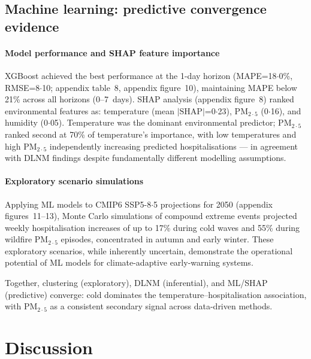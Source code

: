 \documentclass[review,number]{elsarticle}
\begin{document}
\subsection{Machine learning: predictive convergence evidence}

\paragraph{Model performance and SHAP feature importance}
XGBoost achieved the best performance at the 1-day horizon
(MAPE=18${\cdot}$0\%, RMSE=8${\cdot}$10; appendix table~8, appendix figure~10),
maintaining MAPE below 21\% across all horizons (0--7~days). SHAP
analysis (appendix figure~8) ranked environmental features as: temperature
(mean $|\text{SHAP}|$=0${\cdot}$23), $\text{PM}_{2{\cdot}5}$
(0${\cdot}$16), and humidity (0${\cdot}$05). Temperature was the
dominant environmental predictor; $\text{PM}_{2{\cdot}5}$ ranked second at
70\% of temperature's importance, with low temperatures and high
$\text{PM}_{2{\cdot}5}$ independently increasing predicted hospitalisations
--- in agreement with DLNM findings despite fundamentally different
modelling assumptions.

\paragraph{Exploratory scenario simulations}
Applying ML models to CMIP6 SSP5-8${\cdot}$5 projections for 2050
(appendix figures~11--13), Monte Carlo simulations of compound extreme events
projected weekly hospitalisation increases of up to 17\% during cold
waves and 55\% during wildfire $\text{PM}_{2{\cdot}5}$ episodes, concentrated
in autumn and early winter. These exploratory scenarios, while
inherently uncertain, demonstrate the operational potential of ML
models for climate-adaptive early-warning systems.

Together, clustering (exploratory), DLNM (inferential), and ML/SHAP
(predictive) converge: cold dominates the temperature--hospitalisation
association, with $\text{PM}_{2{\cdot}5}$ as a consistent secondary signal
across data-driven methods.

\section{Discussion}
\end{document}

